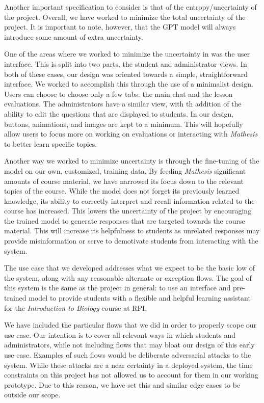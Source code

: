 \documentclass[12pt,a4paper]{article}
\begin{document}
    Another important specification to consider is that of the entropy/uncertainty of the project.
    Overall, we have worked to minimize the total uncertainty of the project.  It is important to note,
    however, that the GPT model will always introduce some amount of extra uncertainty.

    One of the areas where we worked to minimize the uncertainty in was the user interface.  This is
    split into two parts, the student and administrator views.  In both of these cases, our design
    was oriented towards a simple, straightforward interface.  We worked to accomplish this through
    the use of a minimalist design.  Users can choose to choose only a few tabs: the main chat and
    the lesson evaluations.  The administrators have a similar view, with th addition of the ability
    to edit the questions that are displayed to students.  In our design, buttons, animations, and
    images are kept to a minimum.  This will hopefully allow users to focus more on working on
    evaluations or interacting with \textit{Mathesis} to better learn specific topics.

    Another way we worked to minimize uncertainty is through the fine-tuning of the model on our
    own, customized, training data.  By feeding \textit{Mathesis} significant amounts of course
    material, we have narrowed its focus down to the relevant topics of the course.  While the model
    does not forget its previously learned knowledge, its ability to correctly interpret and recall
    information related to the course has increased.  This lowers the uncertainty of the project
    by encouraging the trained model to generate responses that are targeted towards the course
    material.  This will increase its helpfulness to students as unrelated responses may provide
    misinformation or serve to demotivate students from interacting with the system.

    The use case that we developed addresses what we expect to be the basic low of the system, along
    with any reasonable alternate or exception flows.  The goal of this system is the same as the
    project in general: to use an interface and pre-trained model to provide students with a flexible
    and helpful learning assistant for the \textit{Introduction to Biology} course at RPI.

    We have included the particular flows that we did in order to properly scope our use case.  Our intention
    is to cover all relevant ways in which students and administrators, while not including flows that
    may bloat our design of this early use case.  Examples of such flows would be deliberate
    adversarial attacks to the system.  While these attacks are a near certainty in a deployed system,
    the time constraints on this project has not allowed us to account for them in our working prototype.
    Due to this reason, we have set this and similar edge cases to be outside our scope.
\end{document}
